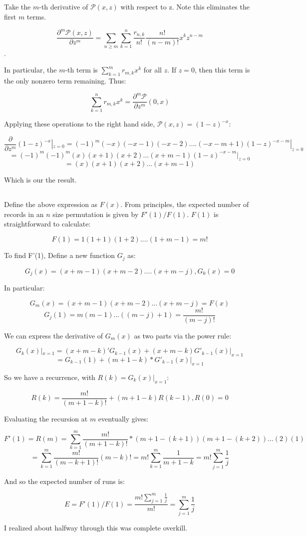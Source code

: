 \documentclass{article}
\begin{document}
\subsection{}
Take the $m$-th derivative of $\mathcal P(x,z)$ with respect to z. Note this eliminates the first $m$ terms.

$$\frac{\partial^m \mathcal P(x,z)}{\partial z^m} = \sum_{n \ge m} \sum_{k = 1}^{n} \frac{r_{n,k}}{n!}\frac{n!}{(n-m)!}x^kz^{n-m}$$. 

In particular, the $m$-th term is $\sum_{k = 1}^{m}r_{m,k} x^k$ for all $z$. If $z = 0$, then this term is the only nonzero term remaining. Thus:

$$\sum_{k = 1}^{n}r_{m,k} x^k = \frac{\partial^m \mathcal P}{\partial z^m}(0,x) $$

Applying these operations to the right hand side, $\mathcal P(x,z) = (1-z)^{-x}$:

$$\frac{\partial}{\partial z^m} (1-z)^{-x}|_{z = 0} = (-1)^m(-x)(-x-1)(-x-2)....(-x - m + 1)(1-z)^{-x-m}|_{z = 0}$$
$$= (-1)^m(-1)^m(x)(x+1)(x+2)...(x + m -1)(1-z)^{-x-m}|_{z = 0}$$
$$= (x)(x+1)(x+2)...(x + m -1)$$

Which is our the result.

\subsection{}

Define the above expression as $F(x)$. From principles, the expected number of records in an $n$ size permutation is given by $F'(1)/F(1)$. $F(1)$ is straightforward to calculate:

$$F(1) = 1(1+1)(1 + 2)....(1 + m - 1) = m!$$

To find F'(1), Define a new function $G_j$ as:

$$G_j(x) = (x+m-1)(x+m-2)....(x+m-j), G_0(x) = 0$$

In particular:

$$G_m(x) = (x+m-1)(x+m-2)...(x+m-j) = F(x)$$ 
$$G_j(1) = m(m-1)...( (m-j)+1) = \frac{m!}{(m-j)!}$$

We can express the derivative of $G_m(x)$ as two parts via the power rule:

$$G_k(x)|_{x = 1} = (x+m-k)' G_{k-1}(x) + (x+m-k)G'_{k-1}(x)|_{x = 1}$$
$$= G_{k-1}(1) + (m+1-k)*G'_{k-1}(x)|_{x = 1}$$

So we have a recurrence, with $R(k) = G_{k}(x)|_{x = 1}$:

$$R(k) = \frac{m!}{(m+1-k)!} + (m+1-k)R(k-1),   R(0) = 0$$

Evaluating the recursion at $m$ eventually gives:

$$F'(1) = R(m) = \sum_{k = 1}^{m} \frac{m!}{(m+1-k)!}*(m+1-(k+1))(m+1-(k+2))...(2)(1)$$
$$= \sum_{k = 1}^{m} \frac{m!}{(m-k+1)!}(m-k)! = m!\sum_{k = 1}^{m}\frac{1}{m+1-k} = m!\sum_{j = 1}^{m}\frac{1}{j}$$

And so the expected number of runs is:

$$E = F'(1)/F(1) = \frac{m!\sum_{j = 1}^{m}\frac{1}{j}}{m!} = \sum_{j = 1}^{m}\frac{1}{j} $$

I realized about halfway through this was complete overkill. 
\end{document}
